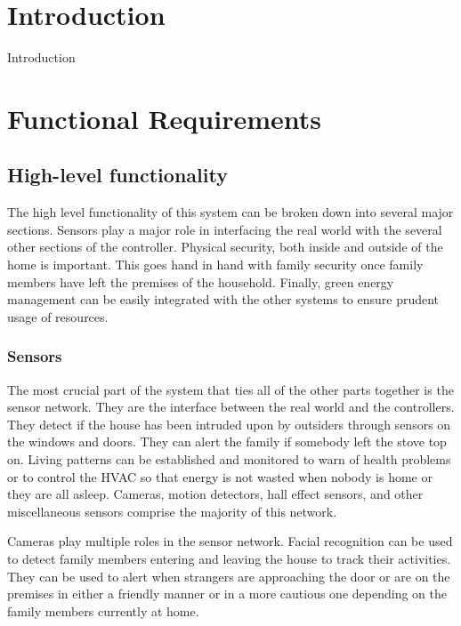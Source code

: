 \documentclass{report}
\begin{document}
\tableofcontents
\listoffigures

\chapter{Introduction}

Introduction

\chapter{Functional Requirements}

\section{High-level functionality}
The high level functionality of this system can be broken down into several
major sections. Sensors play a major role in interfacing the real world with
the several other sections of the controller. Physical security, both inside
and outside of the home is important. This goes hand in hand with family
security once family members have left the premises of the household. Finally,
green energy management can be easily integrated with the other systems to
ensure prudent usage of resources. 

\subsection{Sensors}

The most crucial part of the system that ties all of the other parts together
is the sensor network. They are the interface between the real world and the
controllers. They detect if the house has been intruded upon by outsiders
through sensors on the windows and doors. They can alert the family if somebody
left the stove top on. Living patterns can be established and monitored to warn
of health problems or to control the HVAC so that energy is not wasted when
nobody is home or they are all asleep. Cameras, motion detectors, hall effect
sensors, and other miscellaneous sensors comprise the majority of this network.

Cameras play multiple roles in the sensor network. Facial recognition can be
used to detect family members entering and leaving the house to track their
activities. They can be used to alert when strangers are approaching the door
or are on the premises in either a friendly manner or in a more cautious one
depending on the family members currently at home.
\end{document}
